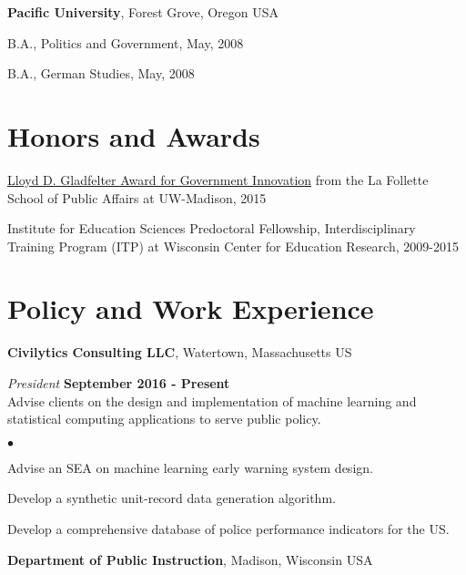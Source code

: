 \documentclass[margin,line]{res}
\newenvironment{list1}{
  \begin{list}{\ding{113}}{%
      \setlength{\itemsep}{0in}
      \setlength{\parsep}{0in} \setlength{\parskip}{0in}
      \setlength{\topsep}{0in} \setlength{\partopsep}{0in} 
      \setlength{\leftmargin}{0.17in}}}{\end{list}}
\newenvironment{list2}{
  \begin{list}{$\bullet$}{%
      \setlength{\itemsep}{0in}
      \setlength{\parsep}{0in} \setlength{\parskip}{0in}
      \setlength{\topsep}{0in} \setlength{\partopsep}{0in} 
      \setlength{\leftmargin}{0.2in}}}{\end{list}}
\begin{document}
\begin{resume}
{\bf Pacific University}, Forest Grove, Oregon USA\\
\vspace*{-.1in}
\begin{list1}
\item[] B.A., Politics and Government,  May, 2008
\item[] B.A., German Studies, May, 2008
\end{list1}


\section{\sc Honors and Awards} 

\href{https://www.lafollette.wisc.edu/news/2015-gladfelter-winners-announced}{Lloyd D. Gladfelter Award for Government Innovation} from the La Follette School of Public Affairs at UW-Madison, 2015

\vspace*{-2.5mm}

Institute for Education Sciences Predoctoral Fellowship, Interdisciplinary Training Program (ITP) at Wisconsin Center for Education Research, 2009-2015

\section{\sc Policy and Work Experience}
{\bf Civilytics Consulting LLC}, Watertown, Massachusetts US

\vspace{-.3cm}
{\em President} \hfill {\bf September 2016 - Present}\\
Advise clients on the design and implementation of machine learning and statistical 
computing applications to serve public policy. 
\begin{list2}
\item Advise an SEA on machine learning early warning system design. 
\item Develop a synthetic unit-record data generation algorithm. 
\item Develop a comprehensive database of police performance indicators for the US.
\end{list2}
\vspace{-.3cm}

{\bf Department of Public Instruction}, Madison, Wisconsin USA


\end{resume}
\end{document}
